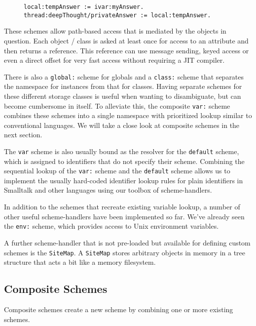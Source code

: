 \documentclass[preprint]{sigplanconf}
\begin{document}
\begin{figure}[htbp]
\begin{lstlisting}[style=numbers,label=local-variables,caption=Different memory variables.]
local:tempAnswer := ivar:myAnswer.
thread:deepThought/privateAnswer := local:tempAnswer.
\end{lstlisting}
\end{figure}

These schemes allow path-based access
that is mediated by the objects in question.   Each object / class is asked at least
once for access to an attribute and then returns a reference.   This reference can
use message sending, keyed access or even a direct offset for very fast
access without requiring a JIT compiler.

There is also a {\tt global:} scheme for globals and a {\tt class:} scheme that separates
the namespace for instances from that for classes.  Having separate schemes for
these different storage classes is useful when wanting to disambiguate,
but can become cumbersome in itself.  To alleviate this, the composite
{\tt var:} scheme combines these schemes into a single namespace
with prioritized lookup similar to conventional languages.  We will take
a close look at composite schemes in the next section.  

The {\tt var} scheme is also usually bound as the resolver for the {\tt default}
scheme, which is assigned to identifiers that do not specify their scheme.
Combining the sequential lookup of the {\tt var:} scheme and the {\tt default}
scheme allows us to implement the usually hard-coded identifier lookup
rules for plain identifiers in Smalltalk and other languages using
our toolbox of scheme-handlers.

In addition to the schemes that recreate existing variable lookup, a number
of other useful scheme-handlers have been implemented so far.  We've
already seen the {\tt env:} scheme, which provides access to Unix
environment variables.  

A further scheme-handler that is not pre-loaded but available for defining
custom schemes is the {\tt SiteMap}.  A {\tt SiteMap} stores arbitrary objects
in memory in a tree structure that acts a bit like a memory filesystem.

\subsection{Composite Schemes}
\label{compositeSchemes}
Composite schemes  create a new scheme by combining one or 
more existing schemes. 
\end{document}
